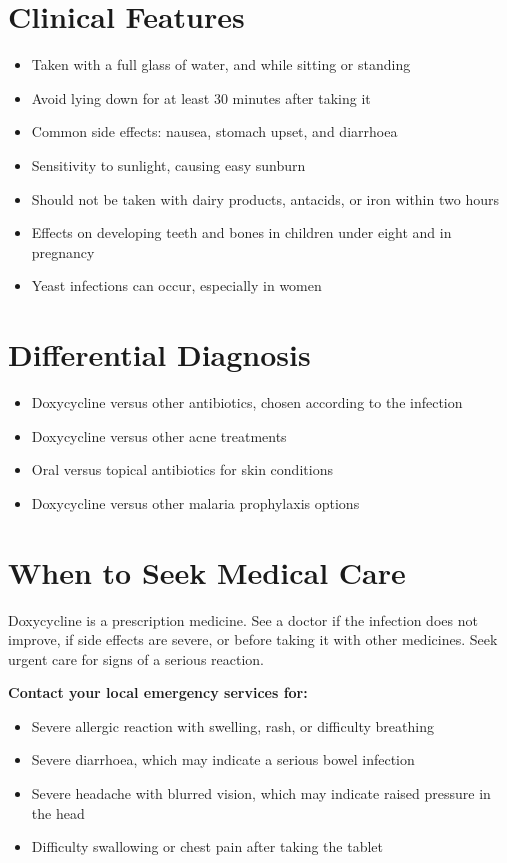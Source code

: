 \section*{Clinical Features}
\begin{itemize}
    \item Taken with a full glass of water, and while sitting or standing
    \item Avoid lying down for at least 30 minutes after taking it
    \item Common side effects: nausea, stomach upset, and diarrhoea
    \item Sensitivity to sunlight, causing easy sunburn
    \item Should not be taken with dairy products, antacids, or iron within two hours
    \item Effects on developing teeth and bones in children under eight and in pregnancy
    \item Yeast infections can occur, especially in women
\end{itemize}

\section*{Differential Diagnosis}
\begin{itemize}
    \item Doxycycline versus other antibiotics, chosen according to the infection
    \item Doxycycline versus other acne treatments
    \item Oral versus topical antibiotics for skin conditions
    \item Doxycycline versus other malaria prophylaxis options
\end{itemize}

\section*{When to Seek Medical Care}
Doxycycline is a prescription medicine. See a doctor if the infection does not improve, if side effects are severe, or before taking it with other medicines. Seek urgent care for signs of a serious reaction.

\textbf{Contact your local emergency services for:}
\begin{itemize}
    \item Severe allergic reaction with swelling, rash, or difficulty breathing
    \item Severe diarrhoea, which may indicate a serious bowel infection
    \item Severe headache with blurred vision, which may indicate raised pressure in the head
    \item Difficulty swallowing or chest pain after taking the tablet
\end{itemize}

